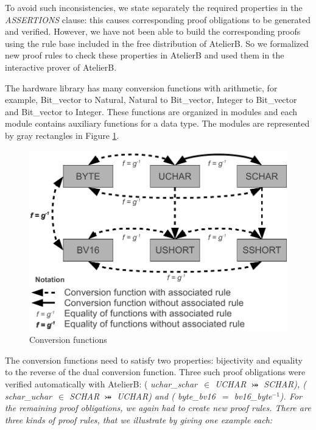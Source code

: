\documentclass[a4paper]{llncs}
\begin{document}
To avoid such inconsistencies, we state separately the required
properties in the \textit{ASSERTIONS\/} clause: this causes
corresponding proof obligations to be generated and verified. However,
we have not been able to build the corresponding proofs using the 
rule base included in the free distribution of AtelierB. So we
formalized new proof rules to check these properties in AtelierB and
used them in the interactive prover of AtelierB.

The hardware library has many conversion functions with
arithmetic,  for example, Bit\_vector to Natural, Natural to
Bit\_vector, Integer to Bit\_vector and Bit\_vector to Integer. These
functions are organized in modules and each module contains auxiliary
functions for a data type. The modules are represented by gray
rectangles in Figure \ref{DiagramTypesRules}.

\begin{figure}[he]
\centering
\includegraphics[width=3.in]{images/Diagram_Types_and_Rules.pdf}
\caption{Conversion functions}
\label{DiagramTypesRules}
\end{figure}


The conversion functions need to satisfy two properties: bijectivity
and equality to the reverse of the dual conversion function. Three
such proof obligations were verified automatically with AtelierB: (\it
uchar\_schar\rm \ $\in$ \textit{UCHAR} $\bij$ \textit{SCHAR}), (\it
schar\_uchar\rm \ $\in$ \textit{SCHAR} $\bij$ \textit{UCHAR}) and (\it
byte\_bv16\rm \ $=$ \it bv16\_byte\rm $^{-1}$).
%
%
For the remaining proof obligations, we again had to create new proof
rules. There are three kinds of proof rules, that we illustrate by giving
one example each:
\end{document}
